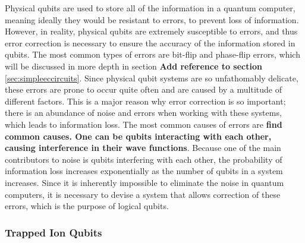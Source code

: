 \documentclass{article}
\begin{document}
Physical qubits are used to store all of the information in a quantum computer, meaning ideally they would be resistant to errors, to prevent loss of information. However, in 
reality, physical qubits are extremely susceptible to errors, and thus error correction is necessary to ensure the accuracy of the information stored in qubits. The most 
common types of errors are bit-flip and phase-flip errors, which will be discussed in more depth in section \textbf{Add reference to section} \ref{sec:simpleeccircuits}. Since physical
qubit systems are so unfathomably delicate, these errors are prone to occur quite often and are caused by a multitude of different factors. This is a major reason why error 
correction is so important; there is an abundance of noise and errors when working with these systems, which leads to information loss. The most common causes of
errors are \textbf{find common causes. One can be qubits interacting with each other, causing interference in their wave functions}. Because one of the main contributors to 
noise is qubits interfering with each other, the probability of information loss increases exponentially as the number of qubits in a system increases. Since it is inherently 
impossible to eliminate the noise in quantum computers, it is necessary to devise a system that allows correction of these errors, which is the purpose of logical qubits.



\subsubsection{Trapped Ion Qubits}
\label{sec:trappedionqubits}
\end{document}
